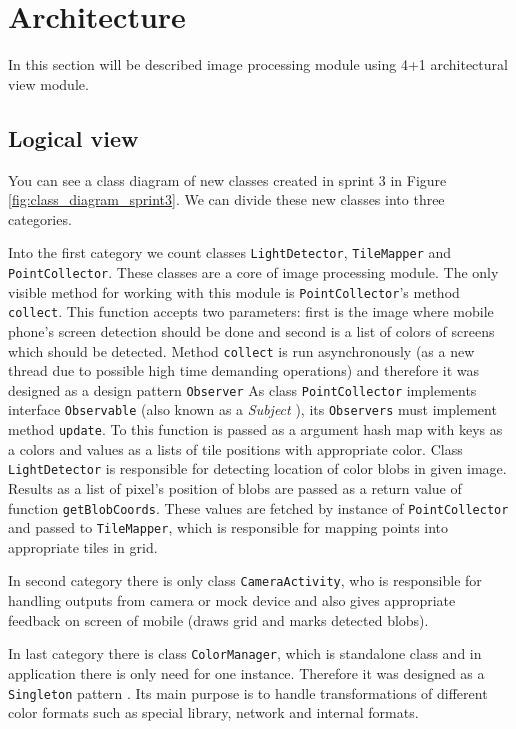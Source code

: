 \section{Architecture}
In this section will be described image processing module using 4+1 architectural view module.

\subsection{Logical view}
You can see a class diagram of new classes created in sprint 3 in Figure \ref{fig:class_diagram_sprint3}. We can divide these new classes into three categories. 

Into the first category we count classes \texttt{LightDetector}, \texttt{TileMapper} and \texttt{PointCollector}. 
These classes are a core of image processing module. 
The only visible method for working with this module is \texttt{PointCollector}'s method \texttt{collect}.
This function accepts two parameters: first is the image where mobile phone's screen detection should be done and second is a list of colors of screens which should be detected. 
Method \texttt{collect} is run asynchronously (as a new thread due to possible high time demanding operations) and therefore it was designed as a design pattern \texttt{Observer}
As class \texttt{PointCollector} implements interface \texttt{Observable} (also known as a \emph{Subject} \cite[p.~326]{Gamma:1995:DPE:186897}), its \texttt{Observers} must implement method \texttt{update}. 
To this function is passed as a argument hash map with keys as a colors and values as a lists of tile positions with appropriate color.
Class \texttt{LightDetector} is responsible for detecting location of color blobs in given image. 
Results as a list of pixel's position of blobs are passed as a return value of function \texttt{getBlobCoords}. 
These values are fetched by instance of \texttt{PointCollector} and passed to \texttt{TileMapper}, which is responsible for mapping points into appropriate tiles in grid.

In second category there is only class \texttt{CameraActivity}, who is responsible for handling outputs from camera or mock device and also gives appropriate feedback on screen of mobile (draws grid and marks detected blobs).

In last category there is class \texttt{ColorManager}, which is standalone class and in application there is only need for one instance. Therefore it was designed as a \texttt{Singleton} pattern \cite[p.~144]{Gamma:1995:DPE:186897}. Its main purpose is to handle transformations of different color formats such as special library, network and internal formats.


